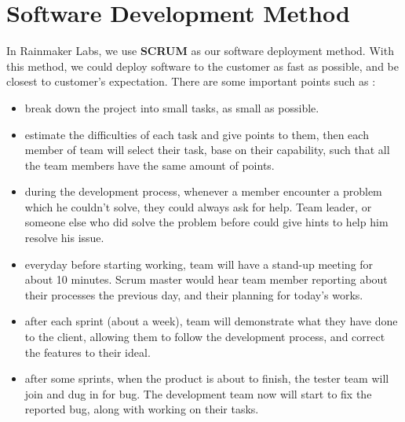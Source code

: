 \chapter{Software Development Method}

In Rainmaker Labs, we use \textbf{SCRUM} as our software deployment method. With this method, we could deploy software to the customer as fast as possible, and be closest to customer's expectation. There are some important points such as :

\begin{itemize}
	\item break down the project into small tasks, as small as possible.
	\item estimate the difficulties of each task and give points to them, then each member of team will select their task, base on their capability, such that all the team members have the same amount of points.
	\item during the development process, whenever a member encounter a problem which he couldn't solve, they could always ask for help. Team leader, or someone else who did solve the problem before could give hints to help him resolve his issue.
	\item everyday before starting working, team will have a stand-up meeting for about 10 minutes. Scrum master would hear team member reporting about their processes the previous day, and their planning for today's works. 
	\item after each sprint (about a week), team will demonstrate what they have done to the client, allowing them to follow the development process, and correct the features to their ideal.
	\item after some sprints, when the product is about to finish, the tester team will join and dug in for bug. The development team now will start to fix the reported bug, along with working on their tasks.
\end{itemize}
